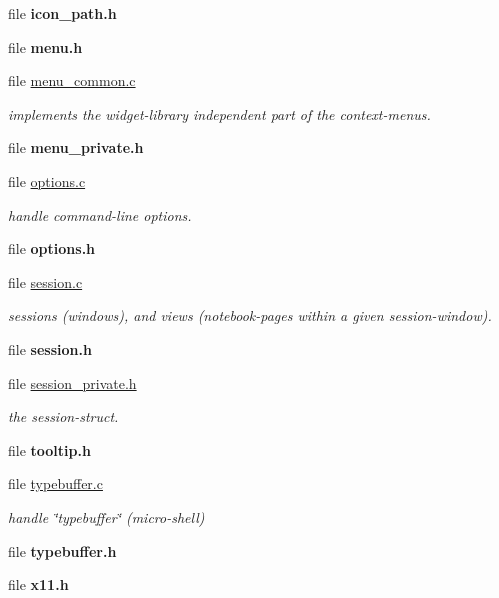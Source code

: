 \begin{CompactItemize}
\item 
file {\bf icon\_\-path.h}
\item 
file {\bf menu.h}
\item 
file \hyperlink{menu__common_8c}{menu\_\-common.c}
\begin{CompactList}\small\item\em implements the widget-library independent part of the context-menus. \item\end{CompactList}

\item 
file {\bf menu\_\-private.h}
\item 
file \hyperlink{options_8c}{options.c}
\begin{CompactList}\small\item\em handle command-line options. \item\end{CompactList}

\item 
file {\bf options.h}
\item 
file \hyperlink{session_8c}{session.c}
\begin{CompactList}\small\item\em sessions (windows), and views (notebook-pages within a given session-window). \item\end{CompactList}

\item 
file {\bf session.h}
\item 
file \hyperlink{session__private_8h}{session\_\-private.h}
\begin{CompactList}\small\item\em the session-struct. \item\end{CompactList}

\item 
file {\bf tooltip.h}
\item 
file \hyperlink{typebuffer_8c}{typebuffer.c}
\begin{CompactList}\small\item\em handle \char`\"{}typebuffer\char`\"{} (micro-shell) \item\end{CompactList}

\item 
file {\bf typebuffer.h}
\item 
file {\bf x11.h}
\end{CompactItemize}

